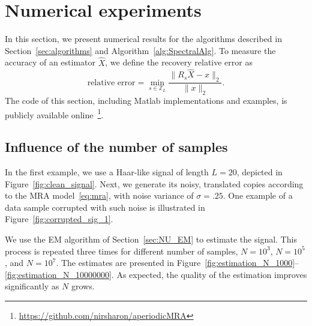 \documentclass{IEEEtran}
\numberwithin{equation}{section}
\numberwithin{figure}{section}
\theoremstyle{plain}
\theoremstyle{definition}
\theoremstyle{remark}
\theoremstyle{plain}
\theoremstyle{remark}
\theoremstyle{plain}
\theoremstyle{plain}
\theoremstyle{remark}
\begin{document}
\section{Numerical experiments} \label{sec:numerics}

In this section, we present numerical results for the algorithms described in Section~\ref{sec:algorithms} and Algorithm~\ref{alg:SpectralAlg}. To measure the accuracy of an estimator $\widehat{X}$, we define the recovery relative error as 
\begin{equation}\label{eq:relative_error}
\textrm{relative error} = \min_{s\in\mathbb{Z}_L}\frac{\|R_s\widehat X - x\|_2}{\|x\|_2}.
\end{equation}
%
 The code of this section, including Matlab implementations and examples, is publicly available online~\footnote{\url{https://github.com/nirsharon/aperiodicMRA}}.

\subsection{Influence of the number of samples}

In the first example, we use a Haar-like signal of length $L=20$, depicted in Figure~\ref{fig:clean_signal}. Next, we generate its noisy, translated copies according to the MRA model~\eqref{eq:mra}, with noise variance of $\sigma = .25$. One example of a data sample corrupted with such noise is illustrated in Figure~\ref{fig:corrupted_sig_1}.

We use the EM algorithm of Section~\ref{sec:NU_EM} to estimate the signal. This process is repeated three times for different number of samples, $N=10^3$, $N=10^5$, and $N=10^7$. The estimates are presented in Figure~\ref{fig:estimation_N_1000}--\ref{fig:estimation_N_10000000}. As expected, the quality of the estimation improves significantly as $N$ grows.
\end{document}
